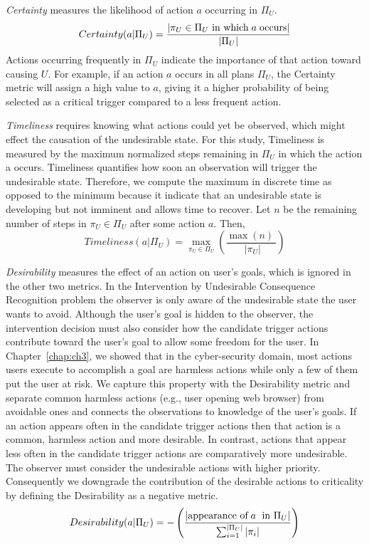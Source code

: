 {\it Certainty} measures the likelihood of action $a$ occurring in $\Pi_U$.
\begin{equation}
\label{eq:certainty}
Certainty (a|\Pi_U)  = \frac{|\pi_U \in \Pi_U \textup{ in which}\; a\; \textup{occurs}|}{|\Pi_U|}
\end{equation}
Actions occurring frequently in $\Pi_U$ indicate the importance of that action toward causing $U$. For example, if an action $a$ occurs in all plans $\Pi_U$, the Certainty metric will assign a high value to $a$, giving it a higher probability of being selected as a critical trigger compared to a less frequent action. 

{\it Timeliness} requires knowing what actions could yet be observed, which might effect the causation of the undesirable state. 
For this study, Timeliness is measured by the maximum normalized steps remaining in $\Pi_U$ in which the action a occurs. 
Timeliness quantifies how soon an observation will trigger the undesirable state. 
Therefore, we compute the maximum in discrete time as opposed to the minimum because it indicate that an undesirable state is developing but not imminent and allows time to recover. 
Let $n$ be the remaining number of steps in $\pi_U \in \Pi_U$ after some action $a$. Then,
\begin{equation}
\label{eq:timeliness}
Timeliness (a|\Pi_U) = \max_{\pi_U \in \Pi_U}\left(\frac{
	\max\left( n \right)\
	}{\; |\pi_U|}\right) 
\end{equation}

{\it Desirability} measures the effect of an action on user's goals, which is ignored in the other two metrics. 
In the Intervention by Undesirable Consequence Recognition problem the observer is only aware of the undesirable state the user wants to avoid.
Although the user's goal is hidden to the observer, the intervention decision must also consider how the candidate trigger actions contribute toward the user's goal to allow some freedom for the user.
In Chapter~\ref{chap:ch3}, we showed that in the cyber-security domain, most actions users execute to accomplish a goal are harmless actions while only a few of them put the user at risk.
We capture this property with the Desirability metric and separate common harmless actions (e.g., user opening web browser) from avoidable ones and connects the observations to knowledge of the user's goals.
If an action appears often in the candidate trigger actions then that action is a common, harmless action and more desirable.
In contrast, actions that appear less often in the candidate trigger actions are comparatively more undesirable.
The observer must consider the undesirable actions with higher priority.
Consequently we downgrade the contribution of the desirable actions to criticality by defining the Desirability as a negative metric.
\begin{equation}
\label{eq:desirability}
Desirability (a|\Pi_U) = - \left( \frac{|\textup{appearance of}\; a\; \textup{ in } \Pi_U|}{\sum_{i=1}^{|\Pi_U|}\left | \pi_i \right |} \right)
\end{equation}

